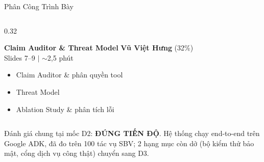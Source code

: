 \documentclass[aspectratio=1610,10pt,xcolor={table}]{beamer}
\begin{document}
\begin{frame}{Phân Công Trình Bày}
\begin{columns}[t]
    \begin{column}{0.32\textwidth}
      \begin{block}{\textbf{Claim Auditor \& Threat Model}}
        {\small\textbf{Vũ Việt Hưng}} {\footnotesize (32\%)}\\
        {\footnotesize Slides 7--9 $\vert$ $\sim$2,5 phút}\\[0.08cm]
        \begin{itemize}\footnotesize
          \item Claim Auditor \& phân quyền tool
          \item Threat Model
          \item Ablation Study \& phân tích lỗi
        \end{itemize}
      \end{block}
    \end{column}
  \end{columns}

  \vspace{0.25cm}
  \begin{tcolorbox}[colback=hcmutgray,colframe=hcmutblue!40,boxrule=0.5pt,arc=1mm]
    \footnotesize\centering
    Đánh giá chung tại mốc D2: \textbf{\color{darkgreen}ĐÚNG TIẾN ĐỘ}. Hệ thống chạy end-to-end trên Google ADK, đã đo trên 100 tác vụ SBV; 2 hạng mục còn dở (bộ kiểm thử bảo mật, cổng dịch vụ công thật) chuyển sang D3.
  \end{tcolorbox}
\end{frame}
\end{document}
